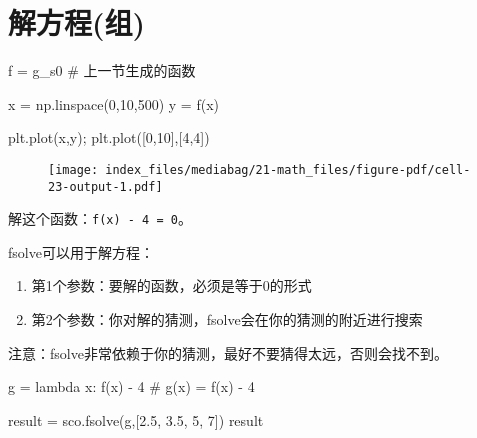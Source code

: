 \documentclass[
  letterpaper,
  DIV=11,
  numbers=noendperiod]{scrreprt}
\newenvironment{Shaded}{\begin{snugshade}}{\end{snugshade}}
\newcommand{\CommentTok}[1]{\textcolor[rgb]{0.37,0.37,0.37}{#1}}
\newcommand{\DecValTok}[1]{\textcolor[rgb]{0.68,0.00,0.00}{#1}}
\newcommand{\FloatTok}[1]{\textcolor[rgb]{0.68,0.00,0.00}{#1}}
\newcommand{\KeywordTok}[1]{\textcolor[rgb]{0.00,0.23,0.31}{#1}}
\newcommand{\NormalTok}[1]{\textcolor[rgb]{0.00,0.23,0.31}{#1}}
\newcommand{\OperatorTok}[1]{\textcolor[rgb]{0.37,0.37,0.37}{#1}}
\providecommand{\tightlist}{%
  \setlength{\itemsep}{0pt}\setlength{\parskip}{0pt}}\usepackage{longtable,booktabs,array}
\begin{document}
\hypertarget{ux89e3ux65b9ux7a0bux7ec4}{%
\section{解方程(组)}\label{ux89e3ux65b9ux7a0bux7ec4}}

\begin{Shaded}
\begin{Highlighting}[]
\NormalTok{f }\OperatorTok{=}\NormalTok{ g\_s0 }\CommentTok{\# 上一节生成的函数}

\NormalTok{x }\OperatorTok{=}\NormalTok{ np.linspace(}\DecValTok{0}\NormalTok{,}\DecValTok{10}\NormalTok{,}\DecValTok{500}\NormalTok{)}
\NormalTok{y }\OperatorTok{=}\NormalTok{ f(x)}

\NormalTok{plt.plot(x,y)}\OperatorTok{;}
\NormalTok{plt.plot([}\DecValTok{0}\NormalTok{,}\DecValTok{10}\NormalTok{],[}\DecValTok{4}\NormalTok{,}\DecValTok{4}\NormalTok{])}
\end{Highlighting}
\end{Shaded}

\begin{figure}[H]

{\centering \texttt{[image: index\_files/mediabag/21-math\_files/figure-pdf/cell-23-output-1.pdf]}

}

\end{figure}

解这个函数：\texttt{f(x)\ -\ 4\ =\ 0}。

fsolve可以用于解方程：

\begin{enumerate}
\def\labelenumi{\arabic{enumi}.}
\tightlist
\item
  第1个参数：要解的函数，必须是等于0的形式
\item
  第2个参数：你对解的猜测，fsolve会在你的猜测的附近进行搜索
\end{enumerate}

注意：fsolve非常依赖于你的猜测，最好不要猜得太远，否则会找不到。

\begin{Shaded}
\begin{Highlighting}[]
\NormalTok{g }\OperatorTok{=} \KeywordTok{lambda}\NormalTok{ x: f(x) }\OperatorTok{{-}} \DecValTok{4} \CommentTok{\# g(x) = f(x) {-} 4}

\NormalTok{result }\OperatorTok{=}\NormalTok{ sco.fsolve(g,[}\FloatTok{2.5}\NormalTok{, }\FloatTok{3.5}\NormalTok{, }\DecValTok{5}\NormalTok{, }\DecValTok{7}\NormalTok{])}
\NormalTok{result }
\end{Highlighting}
\end{Shaded}
\end{document}
